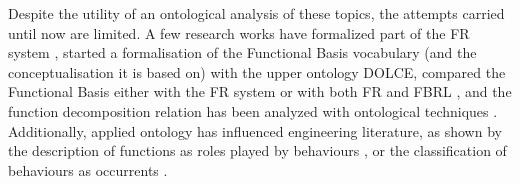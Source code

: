 \documentclass[sw]{iosart2x}
\newcommand{\DOLCE}{\textsc{DOLCE}\xspace} %
\begin{document}

Despite the utility of an ontological analysis of these topics, the attempts carried until now are limited. 
A few research works have formalized part of the FR system \cite{borgoFormalOntologicalPerspective2009}, started a formalisation of the Functional Basis vocabulary (and the conceptualisation it is based on) with the upper ontology \DOLCE \cite{borgoOntologicalRepresentationFunctional2009, borgoFormalizationFunctionsOperations2011}, compared the Functional Basis either with the FR system \cite{garbaczTwoOntologydrivenFormalisations2011} or with both FR and FBRL \cite{kitamuraDeepSemanticMapping2008}, and the function decomposition relation has been analyzed with ontological techniques \cite{vermaasFunctionalDecompositionMereology2009a,vermaasFormalImpossibilityAnalysing2013}. 
Additionally, applied ontology has influenced engineering literature, as shown by the description of functions as roles played by behaviours \cite{mizoguchiUnifiedDefinitionFunction2012, kitamuraOntologicalModelDevice2006, chandrasekaranFunctionDeviceRepresentation2000}, or the classification of behaviours as occurrents \cite{kitamuraOntologicalModelDevice2006}.
\end{document}
